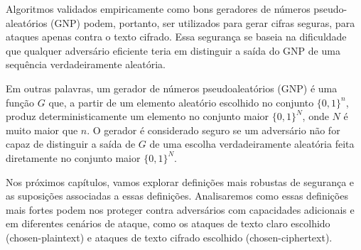 \begin{center}
\end{center}

Algoritmos validados empiricamente como bons geradores de números pseudo-aleatórios (GNP) podem, portanto, ser utilizados para gerar cifras seguras, para ataques apenas contra o texto cifrado.
Essa segurança se baseia na dificuldade que qualquer adversário eficiente teria em distinguir a saída do GNP de uma sequência verdadeiramente aleatória.

Em outras palavras, um gerador de números pseudoaleatórios (GNP) é uma função $G$ que, a partir de um elemento aleatório escolhido no conjunto $\{0,1\}^n$, produz deterministicamente um elemento no conjunto maior $\{0,1\}^N$, onde $N$ é muito maior que $n$.
O gerador é considerado seguro se um adversário não for capaz de distinguir a saída de $G$ de uma escolha verdadeiramente aleatória feita diretamente no conjunto maior $\{0,1\}^N$.

Nos próximos capítulos, vamos explorar definições mais robustas de segurança e as suposições associadas a essas definições.
Analisaremos como essas definições mais fortes podem nos proteger contra adversários com capacidades adicionais e em diferentes cenários de ataque, como os ataques de texto claro escolhido (chosen-plaintext) e ataques de texto cifrado escolhido (chosen-ciphertext).

